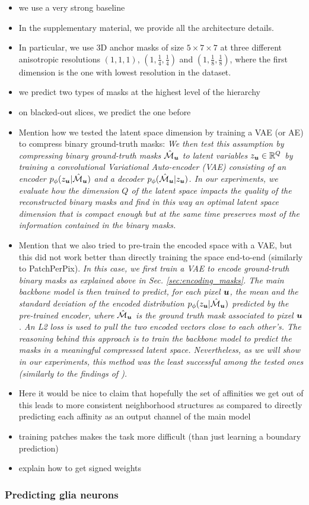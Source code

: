 \begin{itemize}
\item we use a very strong baseline
\item In the supplementary material, we provide all the architecture details.
\item In particular, we use 3D anchor masks of size $5\times 7 \times 7$ at three different anisotropic resolutions $(1,1,1)$, $(1,\frac{1}{4},\frac{1}{4})$ and $(1,\frac{1}{8},\frac{1}{8})$, where the first dimension is the one with lowest resolution in the dataset.
\item we predict two types of \maskname masks at the highest level of the hierarchy
\item on blacked-out slices, we predict the one before
\item Mention how we tested the latent space dimension by training a VAE (or AE) to compress binary ground-truth \maskname masks: \emph{We then test this assumption by compressing binary ground-truth \maskname masks $\hat{\mathcal{M}}_{\coord{u}}$ to latent variables $z_{\coord{u}}\in \mathbb{R}^Q$ by training a convolutional Variational Auto-encoder (VAE) \cite{kingma2013auto,rezende2014stochastic} consisting of an encoder $p_{\phi}(z_{\coord{u}}|\hat{\mathcal{M}}_{\coord{u}})$ and a decoder $p_{\phi}(\hat{\mathcal{M}}_{\coord{u}}|z_{\coord{u}})$.
In our experiments, we evaluate how the dimension $Q$ of the latent space impacts the quality of the reconstructed binary masks and find in this way an optimal latent space dimension that is compact enough but at the same time preserves most of the information contained in the binary masks.}
\item Mention that we also tried to pre-train the encoded space with a VAE, but this did not work better than directly training the space end-to-end (similarly to PatchPerPix). 
\emph{In this case, we first train a VAE to encode ground-truth binary masks as explained above in Sec. \ref{sec:encoding_masks}. 
The main backbone model is then trained to predict, for each pixel $\coord{u}$, the mean and the standard deviation of the encoded distribution $p_{\phi}(z_{\coord{u}}|\hat{\mathcal{M}}_{\coord{u}})$ predicted by the pre-trained encoder, where $\hat{\mathcal{M}}_{\coord{u}}$ is the ground truth \maskname mask associated to pixel $\coord{u}$. An L2 loss is used to pull the two encoded vectors close to each other's. 
The reasoning behind this approach is to train the backbone model to predict the masks in a meaningful compressed latent space. 
Nevertheless, as we will show in our experiments, this method was the least successful among the tested ones (\emph{similarly to the findings of \cite{hirsch2020patchperpix}}).}
\item Here it would be nice to claim that hopefully the set of affinities we get out of this leads to more consistent neighborhood structures as compared to directly predicting each affinity as an output channel of the main model
\item training patches makes the task more difficult (than just learning a boundary prediction)
\item explain how to get signed weights
\end{itemize}


\subsubsection{Predicting glia neurons}
